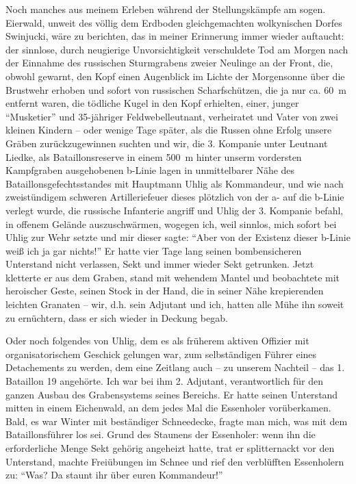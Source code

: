 \documentclass[a5paper,pagesize,10pt,twoside=true]{scrbook}
\begin{document}
Noch manches aus meinem Erleben während der Stellungskämpfe am sogen. Eierwald, unweit des völlig dem Erdboden gleichgemachten wolkynischen Dorfes Swinjucki, wäre zu berichten, das in meiner Erinnerung immer wieder auftaucht: der sinnlose, durch neugierige Unvorsichtigkeit verschuldete Tod am Morgen nach der Einnahme des russischen Sturmgrabens zweier Neulinge an der Front, die, obwohl gewarnt, den Kopf einen Augenblick im Lichte der Morgensonne über die Brustwehr erhoben und sofort von russischen Scharfschützen, die ja nur ca. 60~m entfernt waren, die tödliche Kugel in den Kopf erhielten, einer, junger \enquote{Musketier} und 35-jähriger Feldwebelleutnant, verheiratet und Vater von zwei kleinen Kindern -- oder wenige Tage später, als die Russen ohne Erfolg unsere Gräben zurückzugewinnen suchten und wir, die 3. Kompanie unter Leutnant Liedke, als Bataillonsreserve in einem 500~m hinter unserm vordersten Kampfgraben ausgehobenen b-Linie lagen in unmittelbarer Nähe des Bataillonsgefechtsstandes mit Hauptmann Uhlig als Kommandeur, und wie nach zweistündigem schweren Artilleriefeuer dieses plötzlich von der a- auf die b-Linie verlegt wurde, die russische Infanterie angriff und Uhlig der 3. Kompanie befahl, in offenem Gelände auszuschwärmen, wogegen ich, weil sinnlos, mich sofort bei Uhlig zur Wehr setzte und mir dieser sagte: \enquote{Aber von der Existenz dieser b-Linie weiß ich ja gar nichts!} Er hatte vier Tage lang seinen bombensicheren Unterstand nicht verlassen, Sekt und immer wieder Sekt getrunken. Jetzt kletterte er aus dem Graben, stand mit wehendem Mantel und beobachtete mit heroischer Geste, seinen Stock in der Hand, die in seiner Nähe krepierenden leichten Granaten -- wir, d.h. sein Adjutant und ich, hatten alle Mühe ihn soweit zu ernüchtern, dass er sich wieder in Deckung begab.

Oder noch folgendes von Uhlig, dem es als früherem aktiven Offizier mit organisatorischem Geschick gelungen war, zum selbständigen Führer eines Detachements zu werden, dem eine Zeitlang auch -- zu unserem Nachteil -- das 1. Bataillon 19 angehörte. Ich war bei ihm 2. Adjutant, verantwortlich für den ganzen Ausbau des Grabensystems seines Bereichs. Er hatte seinen Unterstand mitten in einem Eichenwald, an dem jedes Mal die Essenholer vorüberkamen. Bald, es war Winter mit beständiger Schneedecke, fragte man mich, was mit dem Bataillonsführer los sei. Grund des Staunens der Essenholer: wenn ihn die erforderliche Menge Sekt gehörig angeheizt hatte, trat er splitternackt vor den Unterstand, machte Freiübungen im Schnee und rief den verblüfften Essenholern zu: \enquote{Was? Da staunt ihr über euren Kommandeur!}
\end{document}
